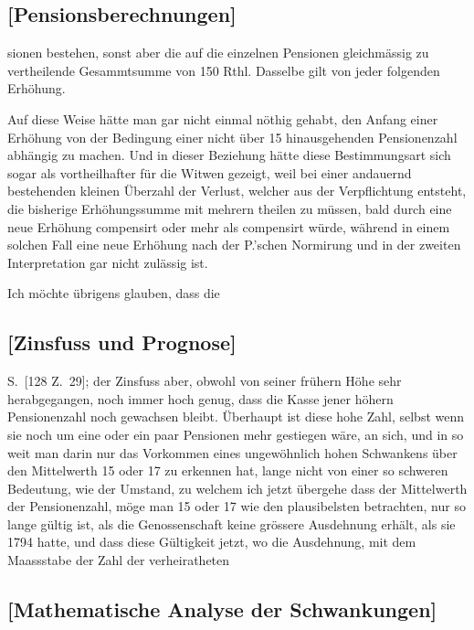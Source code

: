 \documentclass[12pt,a4paper]{article}
\begin{document}
\subsection*{[Pensionsberechnungen]}

sionen bestehen, sonst aber die auf die einzelnen Pensionen gleichmässig zu vertheilende Gesammtsumme von 150 Rthl. Dasselbe gilt von jeder folgenden Erhöhung.

Auf diese Weise hätte man gar nicht einmal nöthig gehabt, den Anfang einer Erhöhung von der Bedingung einer nicht über 15 hinausgehenden Pensionenzahl abhängig zu machen. Und in dieser Beziehung hätte diese Bestimmungsart sich sogar als vortheilhafter für die Witwen gezeigt, weil bei einer andauernd bestehenden kleinen Überzahl der Verlust, welcher aus der Verpflichtung entsteht, die bisherige Erhöhungssumme mit mehrern theilen zu müssen, bald durch eine neue Erhöhung compensirt oder mehr als compensirt würde, während in einem solchen Fall eine neue Erhöhung nach der P.'schen Normirung und in der zweiten Interpretation gar nicht zulässig ist.

Ich möchte übrigens glauben, dass die

\subsection*{[Zinsfuss und Prognose]}

S.~[128 Z.~29]; der Zinsfuss aber, obwohl von seiner frühern Höhe sehr herabgegangen, noch immer hoch genug, dass die Kasse jener höhern Pensionenzahl noch gewachsen bleibt. Überhaupt ist diese hohe Zahl, selbst wenn sie noch um eine oder ein paar Pensionen mehr gestiegen wäre, an sich, und in so weit man darin nur das Vorkommen eines ungewöhnlich hohen Schwankens über den Mittelwerth 15 oder 17 zu erkennen hat, lange nicht von einer so schweren Bedeutung, wie der Umstand, zu welchem ich jetzt übergehe dass der Mittelwerth der Pensionenzahl, möge man 15 oder 17 wie den plausibelsten betrachten, nur so lange gültig ist, als die Genossenschaft keine grössere Ausdehnung erhält, als sie 1794 hatte, und dass diese Gültigkeit jetzt, wo die Ausdehnung, mit dem Maassstabe der Zahl der verheiratheten

\subsection*{[Mathematische Analyse der Schwankungen]}
\end{document}
